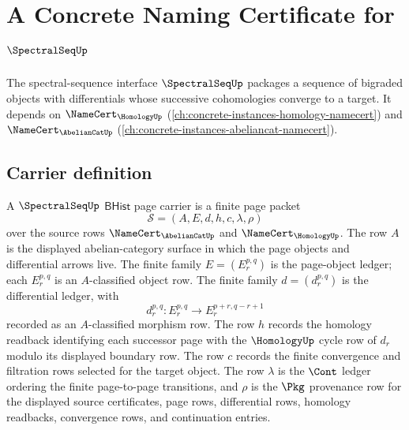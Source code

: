 \chapter{A Concrete Naming Certificate for $\SpectralSeqUp$}
\label{ch:concrete-instances-spectralseq-namecert}

The spectral-sequence interface $\SpectralSeqUp$ packages a sequence of bigraded objects with differentials whose successive cohomologies converge to a target. It depends on $\NameCert_{\HomologyUp}$ (\autoref{ch:concrete-instances-homology-namecert}) and $\NameCert_{\AbelianCatUp}$ (\autoref{ch:concrete-instances-abeliancat-namecert}).

\section{Carrier definition}
\label{sec:spectralseq-carrier}

\begin{definition}
\label{def:spectralseq-bhist-page-carrier}
A $\SpectralSeqUp$ $\mathsf{BHist}$ page carrier is a finite page packet
$$
\mathcal S=(A,E,d,h,c,\lambda,\rho)
$$
over the source rows $\NameCert_{\AbelianCatUp}$ and
$\NameCert_{\HomologyUp}$. The row $A$ is the displayed abelian-category
surface in which the page objects and differential arrows live. The finite
family $E=(E_r^{p,q})$ is the page-object ledger; each $E_r^{p,q}$ is an
$A$-classified object row. The finite family $d=(d_r^{p,q})$ is the
differential ledger, with
$$
d_r^{p,q}:E_r^{p,q}\to E_r^{p+r,q-r+1}
$$
recorded as an $A$-classified morphism row. The row $h$ records the homology
readback identifying each successor page with the $\HomologyUp$ cycle row of
$d_r$ modulo its displayed boundary row. The row $c$ records the finite
convergence and filtration rows selected for the target object. The row
$\lambda$ is the $\Cont$ ledger ordering the finite page-to-page transitions,
and $\rho$ is the $\Pkg$ provenance row for the displayed source certificates,
page rows, differential rows, homology readbacks, convergence rows, and
continuation entries.
\end{definition}

